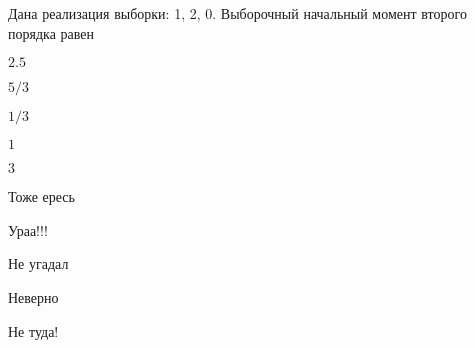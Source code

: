 
\begin{question}
Дана реализация выборки: 1, 2, 0. Выборочный начальный момент второго
порядка равен
\begin{answerlist}
  \item \(2.5\)
  \item \(5/3\)
  \item \(1/3\)
  \item \(1\)
  \item \(3\)
\end{answerlist}
\end{question}

\begin{solution}
\begin{answerlist}
  \item Тоже ересь
  \item Ураа!!!
  \item Не угадал
  \item Неверно
  \item Не туда!
\end{answerlist}
\end{solution}

